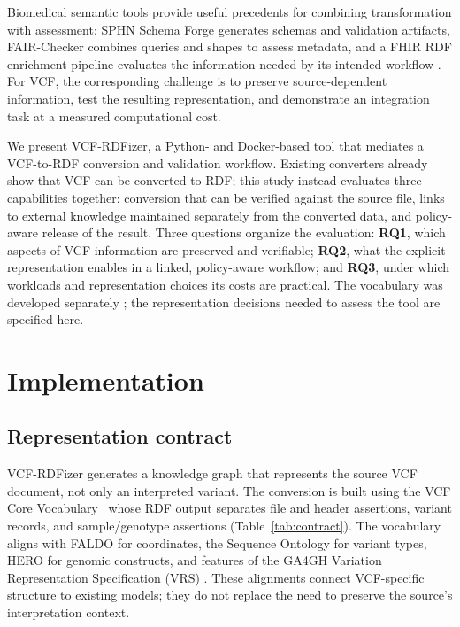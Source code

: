 \documentclass[pdflatex,sn-mathphys-num]{sn-jnl}
\begin{document}
Biomedical semantic tools provide useful precedents for combining transformation with assessment: SPHN Schema Forge generates schemas and validation artifacts, FAIR-Checker combines queries and shapes to assess metadata, and a FHIR RDF enrichment pipeline evaluates the information needed by its intended workflow \cite{toure2025forge,gaignard2023fairchecker,ansari2025etl}. 
For VCF, the corresponding challenge is to preserve source-dependent information, test the resulting representation, and demonstrate an integration task at a measured computational cost.

We present VCF-RDFizer, a Python- and Docker-based tool that mediates a VCF-to-RDF conversion and validation workflow. 
Existing converters already show that VCF can be converted to RDF; this study instead evaluates three capabilities together: conversion that can be verified against the source file, links to external knowledge maintained separately from the converted data, and policy-aware release of the result. 
Three questions organize the evaluation: 
\textbf{RQ1}, which aspects of VCF information are preserved and verifiable; 
\textbf{RQ2}, what the explicit representation enables in a linked, policy-aware workflow; and 
\textbf{RQ3}, under which workloads and representation choices its costs are practical. 
The vocabulary was developed separately \cite{crum_vcfcore_2027}; the representation decisions needed to assess the tool are specified here.

\section{Implementation}\label{sec2}
\subsection{Representation contract}\label{subsec2.1}
VCF-RDFizer generates a knowledge graph that represents the source VCF document, not only an interpreted variant. 
The conversion is built using the VCF Core Vocabulary~\cite{crum_vcfcore_2027} whose RDF output separates file and header assertions, variant records, and sample/genotype assertions (Table~\ref{tab:contract}). 
The vocabulary aligns with FALDO for coordinates, the Sequence Ontology for variant types, HERO for genomic constructs, and features of the GA4GH Variation Representation Specification (VRS) \cite{faldo_2016,seq_ont_2005,hero-genomics_2025,ga4gh_varschema_2021,ga4gh2025VRS}. 
These alignments connect VCF-specific structure to existing models; they do not replace the need to preserve the source's interpretation context.
\end{document}
